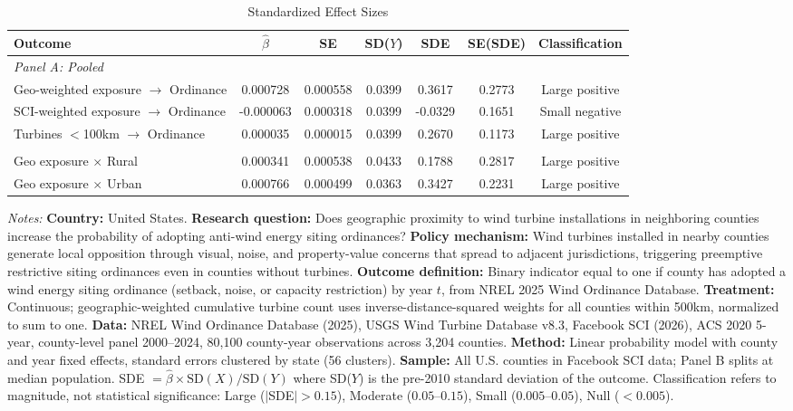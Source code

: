 \begin{table}[htbp]
\centering
\caption{Standardized Effect Sizes}
\label{tab:sde}
\begin{adjustbox}{max width=\textwidth}
\begin{threeparttable}
\begin{tabular}{lcccccc}
\toprule
Outcome & $\hat{\beta}$ & SE & SD($Y$) & SDE & SE(SDE) & Classification \\
\midrule
\multicolumn{7}{l}{\textit{Panel A: Pooled}} \\
\addlinespace
Geo-weighted exposure $\rightarrow$ Ordinance & 0.000728 & 0.000558 & 0.0399 & 0.3617 & 0.2773 & Large positive \\
SCI-weighted exposure $\rightarrow$ Ordinance & -0.000063 & 0.000318 & 0.0399 & -0.0329 & 0.1651 & Small negative \\
Turbines $<$100km $\rightarrow$ Ordinance & 0.000035 & 0.000015 & 0.0399 & 0.2670 & 0.1173 & Large positive \\
\addlinespace
\multicolumn{7}{l}{\textit{Panel B: Heterogeneous (sample splits)}} \\
\addlinespace
Geo exposure $\times$ Rural & 0.000341 & 0.000538 & 0.0433 & 0.1788 & 0.2817 & Large positive \\
Geo exposure $\times$ Urban & 0.000766 & 0.000499 & 0.0363 & 0.3427 & 0.2231 & Large positive \\
\bottomrule
\end{tabular}
\begin{tablenotes}[flushleft]
\small
\item \textit{Notes:} \textbf{Country:} United States. \textbf{Research question:} Does geographic proximity to wind turbine installations in neighboring counties increase the probability of adopting anti-wind energy siting ordinances? \textbf{Policy mechanism:} Wind turbines installed in nearby counties generate local opposition through visual, noise, and property-value concerns that spread to adjacent jurisdictions, triggering preemptive restrictive siting ordinances even in counties without turbines. \textbf{Outcome definition:} Binary indicator equal to one if county has adopted a wind energy siting ordinance (setback, noise, or capacity restriction) by year $t$, from NREL 2025 Wind Ordinance Database. \textbf{Treatment:} Continuous; geographic-weighted cumulative turbine count uses inverse-distance-squared weights for all counties within 500km, normalized to sum to one. \textbf{Data:} NREL Wind Ordinance Database (2025), USGS Wind Turbine Database v8.3, Facebook SCI (2026), ACS 2020 5-year, county-level panel 2000--2024, 80,100 county-year observations across 3,204 counties. \textbf{Method:} Linear probability model with county and year fixed effects, standard errors clustered by state (56 clusters). \textbf{Sample:} All U.S. counties in Facebook SCI data; Panel B splits at median population. SDE $= \hat{\beta} \times \text{SD}(X) / \text{SD}(Y)$ where SD($Y$) is the pre-2010 standard deviation of the outcome. Classification refers to magnitude, not statistical significance: Large ($|$SDE$| > 0.15$), Moderate ($0.05$--$0.15$), Small ($0.005$--$0.05$), Null ($< 0.005$).

\end{tablenotes}
\end{threeparttable}
\end{adjustbox}
\end{table}
